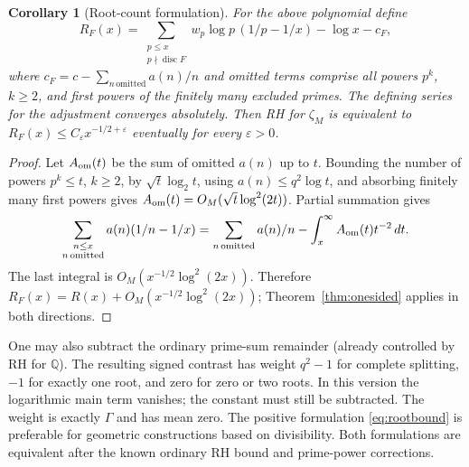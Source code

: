 \documentclass[11pt]{article}
\newtheorem{corollary}[theorem]{Corollary}
\theoremstyle{remark}\newtheorem{remark}[theorem]{Remark}
\newcommand{\Q}{\mathbb Q}\newcommand{\C}{\mathbb C}\newcommand{\F}{\mathbb F}\newcommand{\one}{\mathbf 1}\newcommand{\St}{\mathrm{St}}\newcommand{\Gg}{\Gamma}\newcommand{\PT}{\mathcal P}\newcommand{\eps}{\varepsilon}
\begin{document}
\begin{corollary}[Root-count formulation]\label{cor:root}
For the above polynomial define
\begin{equation}\label{eq:rootbound}
 R_F(x)=\sum_{\substack{p\le x\\p\nmid\operatorname{disc}F}}
  w_p\log p\,(1/p-1/x)-\log x-c_F,
\end{equation}
where $c_F=c-\sum_{n\,\mathrm{omitted}}a(n)/n$ and omitted terms comprise all powers $p^k$, $k\ge2$, and first powers of the finitely many excluded primes. The defining series for the adjustment converges absolutely. Then RH for $\zeta_M$ is equivalent to $R_F(x)\le C_\eps x^{-1/2+\eps}$ eventually for every $\eps>0$.
\end{corollary}
\begin{proof}
Let $A_{\rm om}(t)$ be the sum of omitted $a(n)$ up to $t$. Bounding the number of powers $p^k\le t$, $k\ge2$, by $\sqrt t\log_2 t$, using $a(n)\le q^2\log t$, and absorbing finitely many first powers gives $A_{\rm om}(t)=O_M(\sqrt t\log^2(2t))$. Partial summation gives
\[
 \sum_{\substack{n\le x\\n\,\mathrm{omitted}}}a(n)(1/n-1/x)
 =\sum_{n\,\mathrm{omitted}}a(n)/n-\int_x^\infty A_{\rm om}(t)t^{-2}\,dt.
\]
The last integral is $O_M(x^{-1/2}\log^2(2x))$. Therefore $R_F(x)=R(x)+O_M(x^{-1/2}\log^2(2x))$; Theorem~\ref{thm:onesided} applies in both directions.
\end{proof}
One may also subtract the ordinary prime-sum remainder (already controlled by RH for $\Q$). The resulting signed contrast has weight $q^2-1$ for complete splitting, $-1$ for exactly one root, and zero for zero or two roots. In this version the logarithmic main term vanishes; the constant must still be subtracted. The weight is exactly $\Gg$ and has mean zero. The positive formulation \eqref{eq:rootbound} is preferable for geometric constructions based on divisibility. Both formulations are equivalent after the known ordinary RH bound and prime-power corrections.
\end{document}
